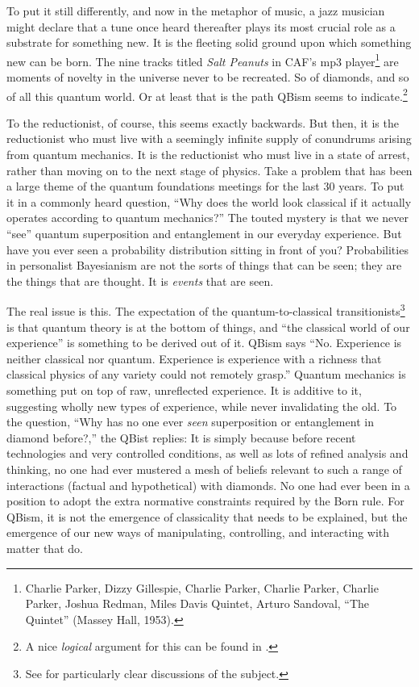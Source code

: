 \documentclass[aps,pra,superscriptaddress,10pt,tightenlines,twocolumn,nofootinbib]{revtex4}
\begin{document}
To put it still differently, and now in the metaphor of music, a jazz musician might declare that a tune once heard thereafter plays its most crucial role as a substrate for something new. It is the fleeting solid ground upon which something new can be born.  The nine tracks titled {\sl Salt Peanuts\/} in CAF's mp3 player\footnote{Charlie Parker, Dizzy Gillespie, Charlie Parker, Charlie Parker, Charlie Parker, Joshua Redman, Miles Davis Quintet, Arturo Sandoval, ``The Quintet'' (Massey Hall, 1953).} are moments of novelty in the universe never to be recreated.  So of diamonds, and so of all this quantum world.  Or at least that is the path QBism seems to indicate.\footnote{A nice {\it logical\/} argument for this can be found in \cite{Ojima92}.}

To the reductionist, of course, this seems exactly backwards.  But then, it is the reductionist who must live with a seemingly infinite supply of conundrums arising from quantum mechanics.  It is the reductionist who must live in a state of arrest, rather than moving on to the next stage of physics.  Take a problem that has been a large theme of the quantum foundations meetings for the last 30 years.  To put it in a commonly heard question, ``Why does the world look classical if it actually operates according to quantum mechanics?''  The touted mystery is that we never ``see'' quantum superposition and entanglement in our everyday experience.  But have you ever seen a probability distribution sitting in front of you?  Probabilities in personalist Bayes\-ian\-ism are not the sorts of things that can be seen; they are the things that are thought.  It is {\it events\/} that are seen.

The real issue is this.  The expectation of the quantum-to-classical transitionists\footnote{See \cite{Schlosshauer07,Schlosshauer08} for particularly clear discussions of the subject.} is that quantum theory is at the bottom of things, and ``the classical world of our experience'' is something to be derived out of it.  QBism says ``No.  Experience is neither classical nor quan\-tum.  Experience is experience with a richness that classical physics of any variety could not remotely grasp.''  Quantum mechanics is something put on top of raw, unreflected experience.  It is additive to it, suggesting wholly new types of experience, while never invalidating the old.  To the question, ``Why has no one ever {\it seen\/} superposition or entanglement in diamond before?,'' the QBist replies:  It is simply because before recent technologies and very controlled conditions, as well as lots of refined analysis and thinking, no one had ever mustered a mesh of beliefs relevant to such a range of interactions (factual and hypothetical) with diamonds.  No one had ever been in a position to adopt the extra normative constraints required by the Born rule.  For QBism, it is not the emergence of classicality that needs to be explained, but the emergence of our new ways of manipulating, controlling, and interacting with matter that do.
\end{document}

